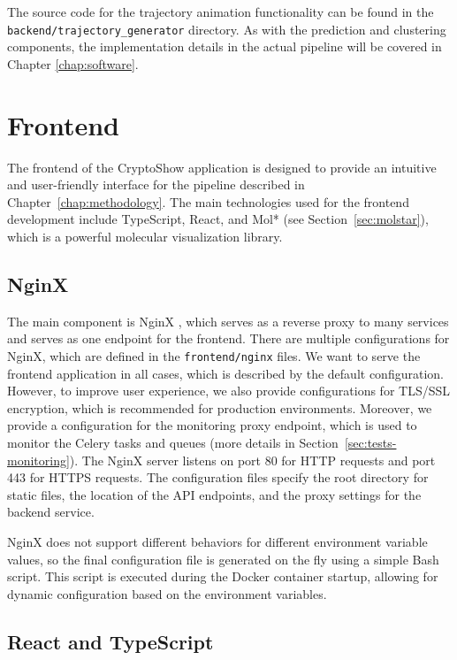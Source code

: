 The source code for the trajectory animation functionality can be found in the \lstinline|backend/trajectory_generator| directory. As with the prediction and clustering components, the implementation details in the actual pipeline will be covered in Chapter \ref{chap:software}.


\section{Frontend}
\label{sec:frontend}

The frontend of the CryptoShow application is designed to provide an intuitive and user-friendly interface for the pipeline described in Chapter~\ref{chap:methodology}. The main technologies used for the frontend development include TypeScript, React, and Mol* (see Section~\ref{sec:molstar}), which is a powerful molecular visualization library. 

\subsection{NginX}
\label{sec:nginx}

The main component is NginX \cite{reese2008nginx}, which serves as a reverse proxy to many services and serves as one endpoint for the frontend. There are multiple configurations for NginX, which are defined in the \lstinline|frontend/nginx| files. We want to serve the frontend application in all cases, which is described by the default configuration. However, to improve user experience, we also provide configurations for TLS/SSL encryption, which is recommended for production environments. Moreover, we provide a configuration for the monitoring proxy endpoint, which is used to monitor the Celery tasks and queues (more details in Section~\ref{sec:tests-monitoring}). The NginX server listens on port 80 for HTTP requests and port 443 for HTTPS requests. The configuration files specify the root directory for static files, the location of the API endpoints, and the proxy settings for the backend service.

NginX does not support different behaviors for different environment variable values, so the final configuration file is generated on the fly using a simple Bash script. This script is executed during the Docker container startup, allowing for dynamic configuration based on the environment variables.

\subsection{React and TypeScript}
\label{sec:react-typescript}


